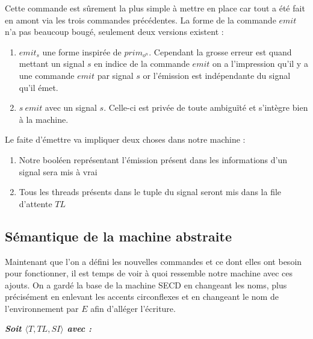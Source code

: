 \documentclass[10pt,a4paper]{report}
\begin{document}
	Cette commande est sûrement la plus simple à mettre en place car tout a été fait en amont via les trois commandes précédentes. La forme de la commande $emit$ n'a pas beaucoup bougé, seulement deux versions existent :
	\begin{enumerate}
		\item $emit_{s}$ une forme inspirée de $prim_{o^{n}}$. Cependant la grosse erreur est quand mettant un signal $s$ en indice de la commande $emit$ on a l'impression qu'il y a une commande $emit$ par signal $s$ or l'émission est indépendante du signal qu'il émet.
		\item $s~emit$ avec un signal $s$. Celle-ci est privée de toute ambiguïté et s'intègre bien à la machine. 
	\end{enumerate}
	\medbreak
	
	Le faite d'émettre va impliquer deux choses dans notre machine :
	\begin{enumerate}					
		\item Notre booléen représentant l'émission présent dans les informations d'un signal sera mis à vrai
		\item Tous les threads présents dans le tuple du signal seront mis dans la file d'attente $TL$ 
	\end{enumerate} 
	\newpage
	
	
	\subsection{Sémantique de la machine abstraite}
	
	Maintenant que l'on a défini les nouvelles commandes et ce dont elles ont besoin pour fonctionner, il est temps de voir à quoi ressemble notre machine avec ces ajouts. On a gardé la base de la machine SECD en changeant les noms, plus précisément en enlevant les accents circonflexes et en changeant le nom de l'environnement par $E$ afin d'alléger l'écriture.
	\bigbreak
	
	
	\textbf{\textit{Soit $\langle T,TL,SI\rangle$ avec :}}
	
\end{document}
